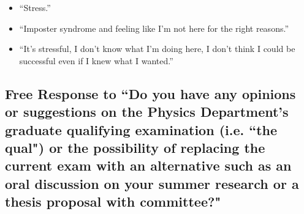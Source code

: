 \documentclass[oneside]{book}   %
\begin{document}
\begin{itemize}
	\item “Stress.”
	\item “Imposter syndrome and feeling like I'm not here for the right reasons.”
	\item “It's stressful, I don't know what I'm doing here, I don't think I could be successful even if I knew what I wanted.”
\end{itemize}

\subsection{Free Response to ``Do you have any opinions or suggestions on the Physics Department's graduate qualifying examination  (i.e. ``the qual") or the possibility of replacing the current exam with an alternative such as an oral discussion on your summer research or a thesis proposal with committee?"}
\label{subsec:qual}
\end{document}
